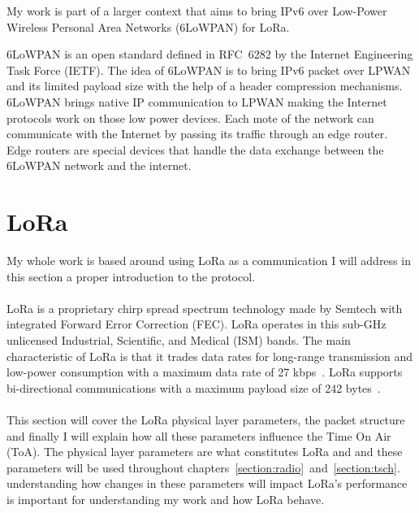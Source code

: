 My work is part of a larger context that aims to bring IPv6 over Low-Power
Wireless Personal Area Networks (6LoWPAN) for LoRa.

6LoWPAN is an open standard defined in RFC~6282 by the Internet Engineering
Task Force (IETF).
The idea of 6LoWPAN is to bring IPv6 packet over LPWAN and its limited payload
size with the help of a header compression mechanisms.
6LoWPAN brings native IP communication to LPWAN making the Internet protocols
work on those low power devices.
Each mote of the network can communicate with the Internet by passing its
traffic through an edge router.
Edge routers are special devices that handle the data exchange between the
6LoWPAN network and the internet.


\section{LoRa\label{section:lora}}

My whole work is based around using LoRa as a communication I will address in
this section a proper introduction to the protocol.

\paragraph{}

LoRa is a proprietary chirp spread spectrum technology made by Semtech with
integrated Forward Error Correction (FEC).
LoRa operates in this sub-GHz unlicensed Industrial, Scientific, and Medical
(ISM) bands.
The main characteristic of LoRa is that it trades data rates for long-range
transmission and low-power consumption with a maximum data rate of
27 kbps~\cite{8030482}.
LoRa supports bi-directional communications with a maximum payload size of 242
bytes~\cite{loraalliance:lorawanspecification}.

\paragraph{}

This section will cover the LoRa physical layer parameters, the packet
structure and finally I will explain how all these parameters influence the
Time On Air (ToA).
The physical layer parameters are what constitutes LoRa and
and these parameters will be used throughout
chapters~\ref{section:radio}~and~\ref{section:tsch}.
understanding how changes in these parameters will impact LoRa's performance
is important for understanding my work and how LoRa behave.

